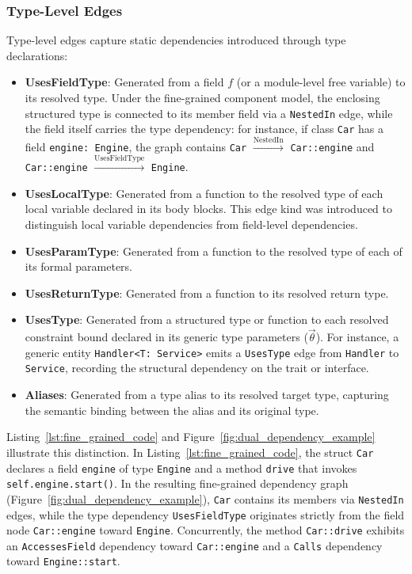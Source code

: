 \subsubsection{Type-Level Edges}
Type-level edges capture static dependencies introduced through type
declarations:
\begin{itemize}
  \item \textbf{UsesFieldType}: Generated from a field $f$ (or a module-level
    free variable) to its resolved type. Under the fine-grained component
    model, the enclosing structured type is connected to its member field via
    a \texttt{NestedIn} edge, while the field itself carries the type
    dependency:
    for instance, if class \texttt{Car} has a field \texttt{engine: Engine},
    the graph contains \texttt{Car} $\xrightarrow{\text{NestedIn}}$
    \texttt{Car::engine}
    and \texttt{Car::engine} $\xrightarrow{\text{UsesFieldType}}$
    \texttt{Engine}.
  \item \textbf{UsesLocalType}: Generated from a function to the
    resolved type of each local variable declared in its body blocks.
    This edge kind was introduced to distinguish local variable
    dependencies from field-level dependencies.
  \item \textbf{UsesParamType}: Generated from a function to the
    resolved type of each of its formal parameters.
  \item \textbf{UsesReturnType}: Generated from a function to its
    resolved return type.
  \item \textbf{UsesType}: Generated from a structured type or function to
    each resolved constraint bound declared in its generic type parameters
    ($\vec{\theta}$). For instance, a generic entity
    \texttt{Handler<T: Service>}
    emits a \texttt{UsesType} edge from \texttt{Handler} to \texttt{Service},
    recording the structural dependency on the trait or interface.
  \item \textbf{Aliases}: Generated from a type alias to its resolved
    target type, capturing the semantic binding between the alias and
    its original type.
\end{itemize}

Listing~\ref{lst:fine_grained_code} and
Figure~\ref{fig:dual_dependency_example} illustrate this distinction.
In Listing~\ref{lst:fine_grained_code}, the struct \texttt{Car}
declares a field \texttt{engine} of type \texttt{Engine} and a method
\texttt{drive} that invokes \texttt{self.engine.start()}. In the
resulting fine-grained dependency graph
(Figure~\ref{fig:dual_dependency_example}), \texttt{Car} contains its
members via \texttt{NestedIn} edges, while the type dependency
\texttt{UsesFieldType} originates strictly from the field node
\texttt{Car::engine} toward \texttt{Engine}. Concurrently, the method
\texttt{Car::drive} exhibits an
\texttt{Ac}\-\texttt{cess}\-\texttt{es}\-\texttt{Field} dependency
toward \texttt{Car::engine} and a \texttt{Calls} dependency toward
\texttt{En}\-\texttt{gine::}\-\texttt{start}.

